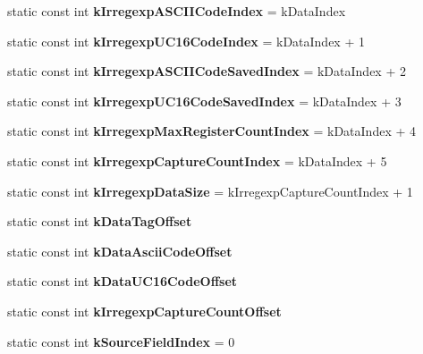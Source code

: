 \begin{DoxyCompactItemize}
\item 
\hypertarget{classv8_1_1internal_1_1_j_s_reg_exp_a6dc4a0aa6315ca324ac5f05b2dc4e3f8}{}static const int {\bfseries k\+Irregexp\+A\+S\+C\+I\+I\+Code\+Index} = k\+Data\+Index\label{classv8_1_1internal_1_1_j_s_reg_exp_a6dc4a0aa6315ca324ac5f05b2dc4e3f8}

\item 
\hypertarget{classv8_1_1internal_1_1_j_s_reg_exp_a624664cd30b9dae03165e951d9421831}{}static const int {\bfseries k\+Irregexp\+U\+C16\+Code\+Index} = k\+Data\+Index + 1\label{classv8_1_1internal_1_1_j_s_reg_exp_a624664cd30b9dae03165e951d9421831}

\item 
\hypertarget{classv8_1_1internal_1_1_j_s_reg_exp_a6fde0108d83608838ab321412c73f471}{}static const int {\bfseries k\+Irregexp\+A\+S\+C\+I\+I\+Code\+Saved\+Index} = k\+Data\+Index + 2\label{classv8_1_1internal_1_1_j_s_reg_exp_a6fde0108d83608838ab321412c73f471}

\item 
\hypertarget{classv8_1_1internal_1_1_j_s_reg_exp_a09739e5fb05fad16b244502716b4a7a7}{}static const int {\bfseries k\+Irregexp\+U\+C16\+Code\+Saved\+Index} = k\+Data\+Index + 3\label{classv8_1_1internal_1_1_j_s_reg_exp_a09739e5fb05fad16b244502716b4a7a7}

\item 
\hypertarget{classv8_1_1internal_1_1_j_s_reg_exp_a6a3fe9d11dfd961544062fff4af53726}{}static const int {\bfseries k\+Irregexp\+Max\+Register\+Count\+Index} = k\+Data\+Index + 4\label{classv8_1_1internal_1_1_j_s_reg_exp_a6a3fe9d11dfd961544062fff4af53726}

\item 
\hypertarget{classv8_1_1internal_1_1_j_s_reg_exp_a0e2173e190617f634aed74000af8f412}{}static const int {\bfseries k\+Irregexp\+Capture\+Count\+Index} = k\+Data\+Index + 5\label{classv8_1_1internal_1_1_j_s_reg_exp_a0e2173e190617f634aed74000af8f412}

\item 
\hypertarget{classv8_1_1internal_1_1_j_s_reg_exp_ab5b2b03b911c494d666b474d4e686233}{}static const int {\bfseries k\+Irregexp\+Data\+Size} = k\+Irregexp\+Capture\+Count\+Index + 1\label{classv8_1_1internal_1_1_j_s_reg_exp_ab5b2b03b911c494d666b474d4e686233}

\item 
static const int {\bfseries k\+Data\+Tag\+Offset}
\item 
static const int {\bfseries k\+Data\+Ascii\+Code\+Offset}
\item 
static const int {\bfseries k\+Data\+U\+C16\+Code\+Offset}
\item 
static const int {\bfseries k\+Irregexp\+Capture\+Count\+Offset}
\item 
\hypertarget{classv8_1_1internal_1_1_j_s_reg_exp_a03a9ac29c03e20399e2f7836440ad0b0}{}static const int {\bfseries k\+Source\+Field\+Index} = 0\label{classv8_1_1internal_1_1_j_s_reg_exp_a03a9ac29c03e20399e2f7836440ad0b0}


\end{DoxyCompactItemize}
